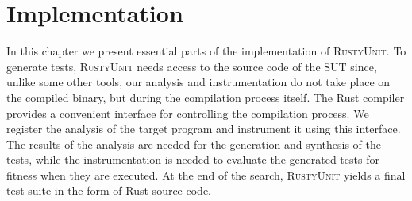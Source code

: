 \documentclass[paper=a4,%
  twoside,%
  BCOR4mm,%
  abstract=true,%
  toc=bibliography,%
  chapterprefix=true,%
  toc=bibliographynumbered,%
  open=right,%
  english,%
  pagesize=pdftex]{scrreprt}
\newcommand{\tech}{\textsc{RustyUnit}\xspace}
\newcommand{\sut}{\ac{SUT}\xspace}
\begin{document}


\clearpage
\chapter{Implementation}
\label{chap:implementation}
In this chapter we present essential parts of the implementation of \tech. To generate tests, \tech needs access to the source code of the \sut since, unlike some other tools, our analysis and instrumentation do not take place on the compiled binary, but during the compilation process itself. The Rust compiler provides a convenient interface for controlling the compilation process. We register the analysis of the target program and instrument it using this interface. The results of the analysis are needed for the generation and synthesis of the tests, while the instrumentation is needed to evaluate the generated tests for fitness when they are executed. At the end of the search, \tech yields a final test suite in the form of Rust source code.
\end{document}

